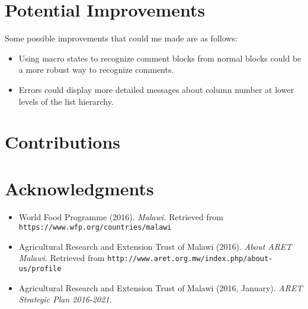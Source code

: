 \documentclass[12pt,letterpaper]{article}
\begin{document}
\section{Potential Improvements}
Some possible improvements that could me made are as follows:
\begin{itemize}
\item Using macro states to recognize comment blocks from normal blocks could be a more robust way to recognize comments.
\item Errors could display more detailed messages about column number at lower levels of the list hierarchy.

\end{itemize}

\section{Contributions}


\clearpage
\section{Acknowledgments}
\begin{flushleft}
\begin{itemize}[leftmargin=12pt]

\item World Food Programme (2016). \emph{Malawi.}
 Retrieved from \texttt{https://www.wfp.org/countries/malawi}

\item Agricultural Research and Extension Trust of Malawi (2016). \emph{About ARET Malawi.}
Retrieved from \texttt{http://www.aret.org.mw/index.php/about-us/profile}

\item Agricultural Research and Extension Trust of Malawi (2016, January). \emph{ARET Strategic Plan 2016-2021.}


\end{itemize}
\end{flushleft}   
\end{document}
